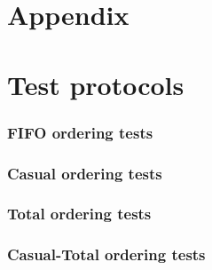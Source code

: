 \documentclass[titlepage, twocolumn, a4paper, 10pt]{article}
\begin{document}






\newpage
\appendix
{}
\section{Appendix}\label{sec:kallkod}
\section{Test protocols}\label{sec:test-protocol}
\subsubsection{FIFO ordering tests}\label{sec:fifo-tests}




\subsubsection{Casual ordering tests}\label{sec:casual-ordering-tests}



\subsubsection{Total ordering tests}\label{sec:total-ordering-tests}



\subsubsection{Casual-Total ordering tests}\label{sec:casual-total-ordering-tests}
\end{document}
